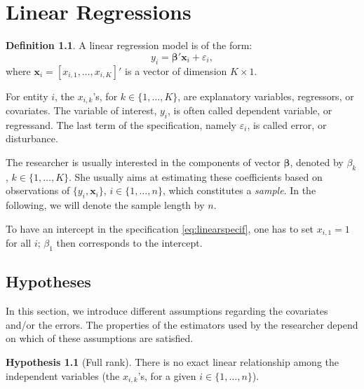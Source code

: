 \documentclass[
  12pt,
]{book}
\theoremstyle{definition}
\newtheorem{definition}{Definition}[chapter]
\theoremstyle{definition}
\theoremstyle{definition}
\theoremstyle{definition}
\newtheorem{hypothesis}{Hypothesis}[chapter]
\theoremstyle{remark}
\begin{document}
\hypertarget{ChapterLS}{%
\chapter{Linear Regressions}\label{ChapterLS}}

\begin{definition}
\protect\hypertarget{def:essai}{}\label{def:essai}A linear regression model is of the form:
\begin{equation}
y_i = \boldsymbol\beta'\mathbf{x}_{i} + \varepsilon_i,\label{eq:linearspecif}
\end{equation}
where \(\mathbf{x}_{i}=[x_{i,1},\dots,x_{i,K}]'\) is a vector of dimension \(K \times 1\).
\end{definition}

For entity \(i\), the \(x_{i,k}\)'s, for \(k \in \{1,\dots,K\}\), are explanatory variables, regressors, or covariates. The variable of interest, \(y_i\), is often called dependent variable, or regressand. The last term of the specification, namely \(\varepsilon_i\), is called error, or disturbance.

The researcher is usually interested in the components of vector \(\boldsymbol\beta\), denoted by \(\beta_k\), \(k \in \{1,\dots,K\}\). She usually aims at estimating these coefficients based on observations of \(\{y_i,\mathbf{x}_{i}\}\), \(i \in \{1,\dots,n\}\), which constitutes a \emph{sample}. In the following, we will denote the sample length by \(n\).

To have an intercept in the specification \eqref{eq:linearspecif}, one has to set \(x_{i,1}=1\) for all \(i\); \(\beta_1\) then corresponds to the intercept.

\hypertarget{linearHyp}{%
\section{Hypotheses}\label{linearHyp}}

In this section, we introduce different assumptions regarding the covariates and/or the errors. The properties of the estimators used by the researcher depend on which of these assumptions are satisfied.

\begin{hypothesis}[Full rank]
\protect\hypertarget{hyp:fullrank}{}\label{hyp:fullrank}There is no exact linear relationship among the independent variables (the \(x_{i,k}\)'s, for a given \(i \in \{1,\dots,n\}\)).
\end{hypothesis}
\end{document}
